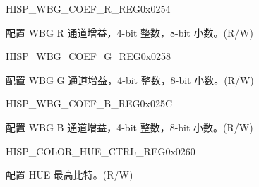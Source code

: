 \begin{register}{H}{ISP\_WBG\_COEF\_R\_REG}{0x0254}\label{regdesc:ISPWBGCOEFRREG}
%
%
\regnewline%
\begin{regdesc}\begin{reglist}
\label{fielddesc:ISPWBGR}\item [ISP\_WBG\_R] 配置 WBG R 通道增益，4-bit 整数，8-bit 小数。(R/W)
\end{reglist}\end{regdesc}
\end{register}


\begin{register}{H}{ISP\_WBG\_COEF\_G\_REG}{0x0258}\label{regdesc:ISPWBGCOEFGREG}
%
%
\regnewline%
\begin{regdesc}\begin{reglist}
\label{fielddesc:ISPWBGG}\item [ISP\_WBG\_G] 配置 WBG G 通道增益，4-bit 整数，8-bit 小数。(R/W)
\end{reglist}\end{regdesc}
\end{register}


\begin{register}{H}{ISP\_WBG\_COEF\_B\_REG}{0x025C}\label{regdesc:ISPWBGCOEFBREG}
%
%
\regnewline%
\begin{regdesc}\begin{reglist}
\label{fielddesc:ISPWBGB}\item [ISP\_WBG\_B] 配置 WBG B 通道增益，4-bit 整数，8-bit 小数。(R/W)
\end{reglist}\end{regdesc}
\end{register}


\begin{register}{H}{ISP\_COLOR\_HUE\_CTRL\_REG}{0x0260}\label{regdesc:ISPCOLORHUECTRLREG}
%
%
\regnewline%
\begin{regdesc}\begin{reglist}
\label{fielddesc:ISPCOLORHUEH}\item [ISP\_COLOR\_HUE\_H] 配置 HUE 最高比特。(R/W)
\end{reglist}\end{regdesc}
\end{register}


